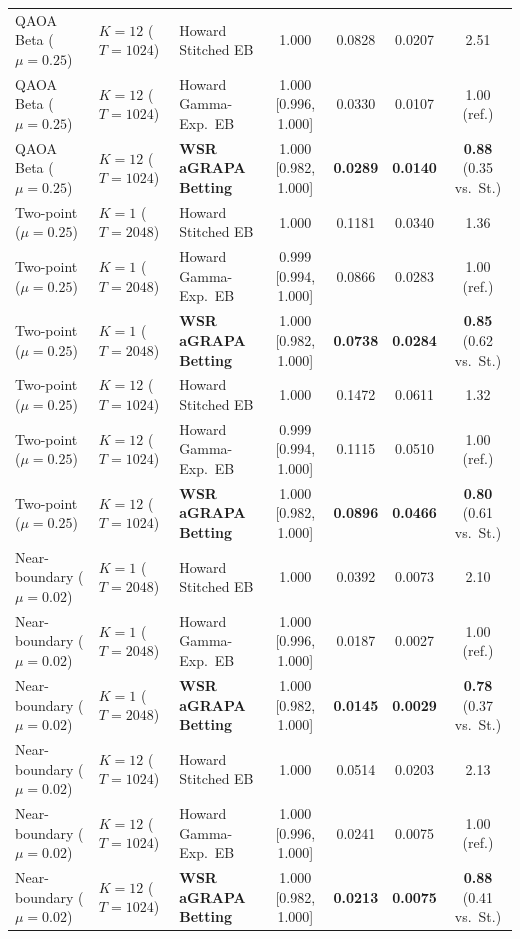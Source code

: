 \begin{table}[htbp]
\begin{tabular}{@{}l l l c c c c@{}}
QAOA Beta ($\mu=0.25$) & $K=12$ ($T=1024$) & Howard Stitched EB & 1.000 & 0.0828 & 0.0207 & 2.51 \\
QAOA Beta ($\mu=0.25$) & $K=12$ ($T=1024$) & Howard Gamma-Exp.\ EB & 1.000 [0.996, 1.000] & 0.0330 & 0.0107 & 1.00 (ref.) \\
QAOA Beta ($\mu=0.25$) & $K=12$ ($T=1024$) & \textbf{WSR aGRAPA Betting} & 1.000 [0.982, 1.000] & \textbf{0.0289} & \textbf{0.0140} & \textbf{0.88} (0.35 vs.\ St.) \\
Two-point ($\mu=0.25$) & $K=1$ ($T=2048$) & Howard Stitched EB & 1.000 & 0.1181 & 0.0340 & 1.36 \\
Two-point ($\mu=0.25$) & $K=1$ ($T=2048$) & Howard Gamma-Exp.\ EB & 0.999 [0.994, 1.000] & 0.0866 & 0.0283 & 1.00 (ref.) \\
Two-point ($\mu=0.25$) & $K=1$ ($T=2048$) & \textbf{WSR aGRAPA Betting} & 1.000 [0.982, 1.000] & \textbf{0.0738} & \textbf{0.0284} & \textbf{0.85} (0.62 vs.\ St.) \\
Two-point ($\mu=0.25$) & $K=12$ ($T=1024$) & Howard Stitched EB & 1.000 & 0.1472 & 0.0611 & 1.32 \\
Two-point ($\mu=0.25$) & $K=12$ ($T=1024$) & Howard Gamma-Exp.\ EB & 0.999 [0.994, 1.000] & 0.1115 & 0.0510 & 1.00 (ref.) \\
Two-point ($\mu=0.25$) & $K=12$ ($T=1024$) & \textbf{WSR aGRAPA Betting} & 1.000 [0.982, 1.000] & \textbf{0.0896} & \textbf{0.0466} & \textbf{0.80} (0.61 vs.\ St.) \\
Near-boundary ($\mu=0.02$) & $K=1$ ($T=2048$) & Howard Stitched EB & 1.000 & 0.0392 & 0.0073 & 2.10 \\
Near-boundary ($\mu=0.02$) & $K=1$ ($T=2048$) & Howard Gamma-Exp.\ EB & 1.000 [0.996, 1.000] & 0.0187 & 0.0027 & 1.00 (ref.) \\
Near-boundary ($\mu=0.02$) & $K=1$ ($T=2048$) & \textbf{WSR aGRAPA Betting} & 1.000 [0.982, 1.000] & \textbf{0.0145} & \textbf{0.0029} & \textbf{0.78} (0.37 vs.\ St.) \\
Near-boundary ($\mu=0.02$) & $K=12$ ($T=1024$) & Howard Stitched EB & 1.000 & 0.0514 & 0.0203 & 2.13 \\
Near-boundary ($\mu=0.02$) & $K=12$ ($T=1024$) & Howard Gamma-Exp.\ EB & 1.000 [0.996, 1.000] & 0.0241 & 0.0075 & 1.00 (ref.) \\
Near-boundary ($\mu=0.02$) & $K=12$ ($T=1024$) & \textbf{WSR aGRAPA Betting} & 1.000 [0.982, 1.000] & \textbf{0.0213} & \textbf{0.0075} & \textbf{0.88} (0.41 vs.\ St.) \\
\bottomrule
\end{tabular}
\end{table}
